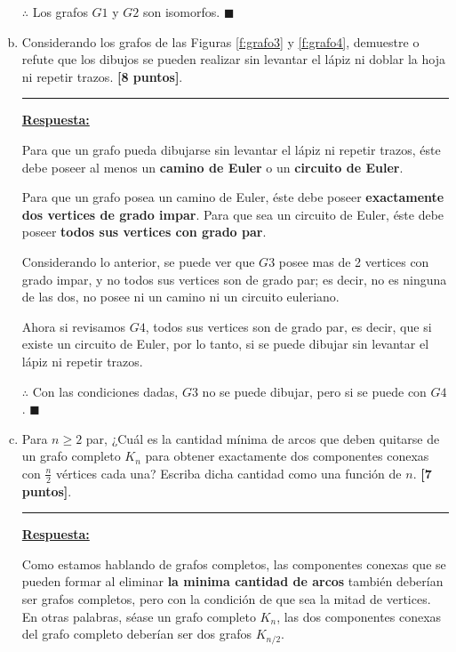 \documentclass[letterpaper,10pt]{article}
\begin{document}
\begin{enumerate}[a)]
$\therefore$ Los grafos $G1$ y $G2$ son isomorfos. \hfill \(\blacksquare\)

\vspace{4cm}

\item Considerando los grafos de las Figuras \ref{f:grafo3} y \ref{f:grafo4}, demuestre o refute que los dibujos se pueden realizar sin levantar el lápiz ni doblar la hoja ni repetir trazos. \textbf{[8 puntos]}.

\rule{5cm}{0.4pt}

\underline{\textbf{Respuesta:}}

Para que un grafo pueda dibujarse sin levantar el lápiz ni repetir trazos, éste debe poseer al menos un \textbf{camino de Euler} o un \textbf{circuito de Euler}.

Para que un grafo posea un camino de Euler, éste debe poseer \textbf{exactamente dos vertices de grado impar}. Para que sea un circuito de Euler, éste debe poseer \textbf{todos sus vertices con grado par}.

Considerando lo anterior, se puede ver que $G3$ posee mas de 2 vertices con grado impar, y no todos sus vertices son de grado par; es decir, no es ninguna de las dos, no posee ni un camino ni un circuito euleriano.

Ahora si revisamos $G4$, todos sus vertices son de grado par, es decir, que si existe un circuito de Euler, por lo tanto, si se puede dibujar sin levantar el lápiz ni repetir trazos.

$\therefore$ Con las condiciones dadas, $G3$ no se puede dibujar, pero si se puede con $G4$. \hfill \(\blacksquare\)










\newpage


\item Para $n \geq 2$ par, ¿Cuál es la cantidad mínima de arcos que deben quitarse de un grafo completo $K_n$ para obtener exactamente dos componentes conexas con $\frac{n}{2}$ vértices cada una? Escriba dicha cantidad como una función de $n$. \textbf{[7 puntos]}.

\rule{5cm}{0.4pt}

\underline{\textbf{Respuesta:}}

Como estamos hablando de grafos completos, las componentes conexas que se pueden formar al eliminar \textbf{la minima cantidad de arcos} también deberían ser grafos completos, pero con la condición de que sea la mitad de vertices. En otras palabras, séase un grafo completo $K_n$, las dos componentes conexas del grafo completo deberían ser dos grafos $K_{n/2}$.



\end{enumerate}
\end{document}
